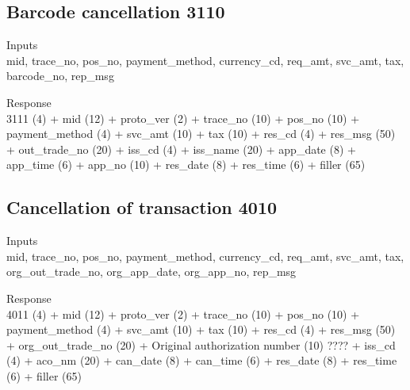 \documentclass[12pt]{article}
\begin{document}
\subsection{Barcode cancellation 3110}
    \begin{description}
        \item Inputs \\
            mid, trace\_no, pos\_no, 
            payment\_method, currency\_cd, req\_amt, 
            svc\_amt, tax, barcode\_no, rep\_msg \\
        \item Response \\
        3111 (4) + mid (12) + proto\_ver (2) 
        + trace\_no (10) + pos\_no (10) + payment\_method (4) 
        + svc\_amt (10) + tax (10) + res\_cd (4)
        + res\_msg (50) + out\_trade\_no (20) + iss\_cd (4)
        + iss\_name (20) + app\_date (8) + app\_time (6) 
        + app\_no (10) + res\_date (8) + res\_time (6)
        + filler (65)
    \end{description}

\subsection{Cancellation of transaction 4010}
    \begin{description}
        \item Inputs \\
            mid, trace\_no, pos\_no, payment\_method, 
            currency\_cd, req\_amt, svc\_amt, 
            tax, org\_out\_trade\_no, org\_app\_date, org\_app\_no,
            rep\_msg\\
        \item Response \\
        4011 (4) + mid (12) + proto\_ver (2) 
        + trace\_no (10) + pos\_no (10) + payment\_method (4) 
        + svc\_amt (10) + tax (10) + res\_cd (4)
        + res\_msg (50) + org\_out\_trade\_no (20) + Original authorization number (10) ????
        + iss\_cd (4) + aco\_nm (20) + can\_date (8)
        + can\_time (6) + res\_date (8) + res\_time (6)
        + filler (65)
    \end{description}
\end{document}
